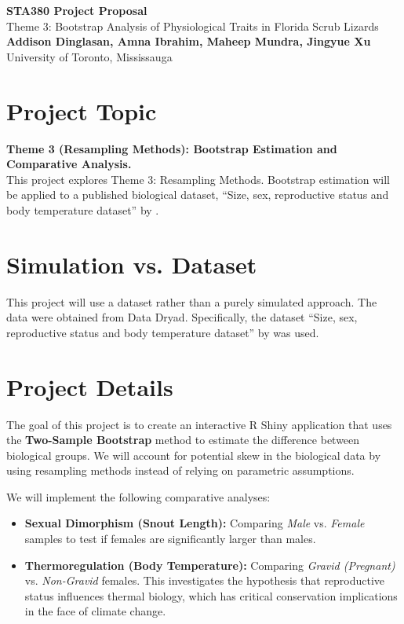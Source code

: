 \documentclass{article}
\begin{document}
	\begin{center}
		\LARGE{\textbf{STA380 Project Proposal}} \\
		\vspace{1em}
		\Large{Theme 3: Bootstrap Analysis of Physiological Traits in Florida Scrub Lizards} \\
		\vspace{1em}
		\normalsize\textbf{Addison Dinglasan, Amna Ibrahim, Maheep Mundra, Jingyue Xu} \\
		\vspace{0.5em}
		\normalsize{University of Toronto, Mississauga}
	\end{center}

    \section{Project Topic}
    \noindent \textbf{Theme 3 (Resampling Methods): Bootstrap Estimation and Comparative Analysis.} \\
    \noindent This project explores Theme 3: Resampling Methods. Bootstrap estimation will be applied to a published biological dataset, ``Size, sex, reproductive status and body temperature dataset'' by \cite{gainsbury2021size}. \\
    
    \section{Simulation vs. Dataset}
    \noindent This project will use a dataset rather than a purely simulated approach. The data were obtained from Data Dryad. Specifically, the dataset ``Size, sex, reproductive status and body temperature dataset'' by \cite{gainsbury2021size} was used.

    \section{Project Details}
    \noindent The goal of this project is to create an interactive R Shiny application that uses the \textbf{Two-Sample Bootstrap} method to estimate the difference between biological groups. We will account for potential skew in the biological data by using resampling methods instead of relying on parametric assumptions.
    
    \noindent We will implement the following comparative analyses:
    \begin{itemize}
        \item \textbf{Sexual Dimorphism (Snout Length):} Comparing \textit{Male} vs. \textit{Female} samples to test if females are significantly larger than males.
        \item \textbf{Thermoregulation (Body Temperature):} Comparing \textit{Gravid (Pregnant)} vs. \textit{Non-Gravid} females. This investigates the hypothesis that reproductive status influences thermal biology, which has critical conservation implications in the face of climate change.
    \end{itemize}
\end{document}
